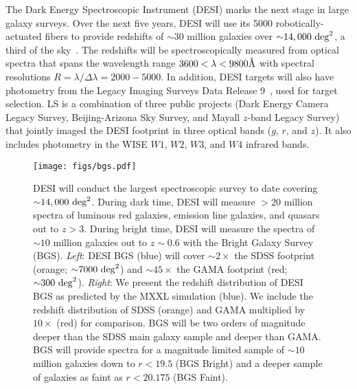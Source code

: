 The Dark Energy Spectroscopic Instrument (DESI) marks the next stage in large
galaxy surveys. 
Over the next five years, DESI will use its 5000 robotically-actuated fibers to
provide redshifts of ${\sim}30$ million galaxies over 
${\sim}14,000~{\rm deg}^2$, a third of the sky~\citep{desicollaboration2016}.
The redshifts will be spectroscopically measured from optical spectra that
spans the wavelength range $3600 < \lambda < 9800\AA$ with spectral resolutions
$R = \lambda/\Delta \lambda = 2000 - 5000$.
In addition, DESI targets will also have photometry from the Legacy Imaging
Surveys Data Release 9~\citep[LS][]{dey2019}, used for target selection. 
LS is a combination of three public projects (Dark Energy Camera Legacy Survey,
Beijing-Arizona Sky Survey, and Mayall $z$-band Legacy Survey) that jointly
imaged the DESI footprint in three optical bands ($g$, $r$, and $z$). 
It also includes photometry in the WISE $W1$, $W2$, $W3$, and $W4$ infrared bands.




\begin{figure}
\begin{center}
\texttt{[image: figs/bgs.pdf]} 
\caption{
    DESI will conduct the largest spectroscopic survey to date covering
    ${\sim}14,000~{\rm deg}^2$. 
    During dark time, DESI will measure ${>}20$ million spectra of luminous red
    galaxies, emission line galaxies, and quasars out to $z > 3$.
    During bright time, DESI will measure the spectra of ${\sim}10$ million
    galaxies out to $z{\sim}0.6$ with the Bright Galaxy Survey (BGS).
    {\em Left}: DESI BGS (blue) will cover ${\sim}2\times$ the SDSS footprint
    (orange; ${\sim}7000~{\rm deg}^2$) and ${\sim}45\times$ the GAMA footprint
    (red; ${\sim}300~{\rm deg}^2$).
    {\em Right}: We present the redshift distribution of DESI BGS as predicted
    by the MXXL simulation (blue).  
    We include the redshift distribution of SDSS (orange) and GAMA multiplied
    by $10\times$ (red) for comparison. 
    BGS will be two orders of magnitude deeper than the SDSS main galaxy sample
    and deeper than GAMA.
    BGS will provide spectra for a magnitude limited sample of ${\sim}10$
    million galaxies down to $r < 19.5$ (BGS Bright) and a deeper sample of
    galaxies as faint as $r < 20.175$ (BGS Faint).
}
\label{fig:bgs}
\end{center}
\end{figure}

